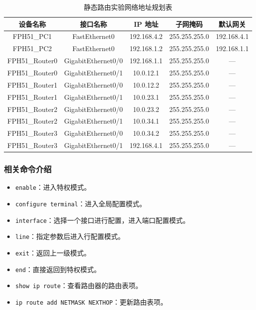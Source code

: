 \documentclass[UTF8,12pt,a4paper]{ctexart}
\begin{document}
\begin{table}[H]
\centering
\caption{静态路由实验网络地址规划表}
\begin{tabular}{ccccc}
\hline
设备名称 & 接口名称 & IP 地址 & 子网掩码 & 默认网关 \\
\hline
FPH51\_PC1 & FastEthernet0 & 192.168.4.2 & 255.255.255.0 & 192.168.4.1 \\
FPH51\_PC2 & FastEthernet0 & 192.168.1.2 & 255.255.255.0 & 192.168.1.1 \\
FPH51\_Router0 & GigabitEthernet0/0 & 192.168.1.1 & 255.255.255.0 & — \\
FPH51\_Router0 & GigabitEthernet0/1 & 10.0.12.1 & 255.255.255.0 & — \\
FPH51\_Router1 & GigabitEthernet0/0 & 10.0.12.2 & 255.255.255.0 & — \\
FPH51\_Router1 & GigabitEthernet0/1 & 10.0.23.1 & 255.255.255.0 & — \\
FPH51\_Router2 & GigabitEthernet0/0 & 10.0.23.2 & 255.255.255.0 & — \\
FPH51\_Router2 & GigabitEthernet0/1 & 10.0.34.1 & 255.255.255.0 & — \\
FPH51\_Router3 & GigabitEthernet0/0 & 10.0.34.2 & 255.255.255.0 & — \\
FPH51\_Router3 & GigabitEthernet0/1 & 192.168.4.1 & 255.255.255.0 & — \\
\hline
\end{tabular}
\end{table}

\subsubsection*{相关命令介绍}

\begin{itemize}
  \item \texttt{enable}：进入特权模式。
  \item \texttt{configure terminal}：进入全局配置模式。
  \item \texttt{interface}：选择一个接口进行配置，进入端口配置模式。
  \item \texttt{line}：指定参数后进入行配置模式。
  \item \texttt{exit}：返回上一级模式。
  \item \texttt{end}：直接返回到特权模式。
  \item \texttt{show ip route}：查看路由器的路由表项。
  \item \texttt{ip route add NETMASK NEXTHOP}：更新路由表项。
\end{itemize}
\end{document}
